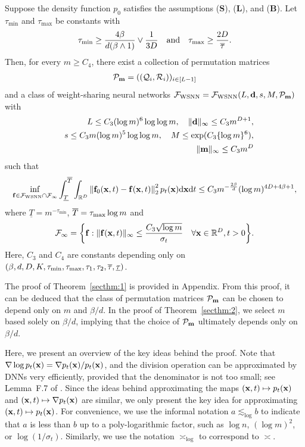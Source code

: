 \documentclass[twoside,11pt]{article}
\def\cF{\mathcal F}
\def\cP{\mathcal P}
\def\cQ{\mathcal Q}
\def\cR{\mathcal R}
\newcommand{\bB}{{\bf B}}
\newcommand{\bd}{{\bf d}}
\newcommand{\bff}{{\bf f}}
\newcommand{\bL}{{\bf L}}
\newcommand{\bfm}{{\bf m}}
\newcommand{\bS}{{\bf S}}
\newcommand{\bx}{{\bf x}}
\newcommand{\bbR}{{\mathbb R}}
\newcommand{\bean}{\setlength\arraycolsep{1pt}\begin{eqnarray*}}
\newcommand{\eean}{\end{eqnarray*}}
\def\d{{\rm d}}
\begin{document}
\begin{theorem}
\label{secthm:1}
Suppose the density function $p_0$ satisfies the assumptions (\bS), (\bL), and (\bB). Let $\tau_{\min}$ and $\tau_{\max}$ be constants with
\bean
\tau_{\rm min} \geq \frac{4\beta}{d (\beta \wedge 1)} \vee \frac{1}{3D}
\quad \text{and} \quad
\tau_{\rm max} \geq \frac{2D}{\overline \tau}.
\eean
Then, for every $m \geq  C_{4}$, there exist a collection of permutation matrices 
\bean
\cP_{\bfm} = ( ( \cQ_i, \cR_i ) )_{i \in [L-1]}
\eean
and a class of weight-sharing neural networks $\cF_{\rm WSNN} = \cF_{\rm WSNN}(L,\bd,s,M,\cP_{\bfm})$ with
\bean
&& L \leq C_{3} ( \log m )^{6} \log \log m , \quad \| \bd\|_{\infty} \leq C_{3}  m^{D+1},
\\
&& s \leq  C_{3}  m (\log m)^{5} \log \log m, \quad M \leq \exp( C_{3}  \{ \log m \}^6 ),
\\
&& \| \bfm \|_{\infty} \leq C_{3} m^{D}
\eean
such that
\bean
 \inf_{\bff \in \cF_{\rm WSNN} \cap \cF_\infty }
 \int_{\underline{T}}^{\overline{T}} \int_{\bbR^{D}} \left\| \bff_0(\bx, t) - \bff(\bx,t) \right\|_2^2 p_t(\bx) \d \bx \d t
 \leq  C_{3}  m^{-\frac{2\beta}{d}} (\log m)^{4D+ 4\beta + 1},
\eean
where $\underline{T} = m^{-\tau_{\min}}$, $\overline{T} = \tau_{\rm max} \log m$ and
\bean
 \cF_\infty = \bigg\{ \bff: \| \bff(\bx,t) \|_{\infty} \leq \frac{C_{3} \sqrt{\log m}}{\sigma_t} \quad \forall \bx \in \bbR^{D}, t > 0 \bigg\}.
\eean
Here, $C_3$ and $C_{4}$ are constants depending only on $(\beta, d, D, K, \tau_{\rm min}, \tau_{\rm max}, \tau_{1}, \tau_{2}, \overline{\tau}, \underline{\tau})$.
\end{theorem}

The proof of Theorem~\ref{secthm:1} is provided in Appendix.
From this proof, it can be deduced that the class of permutation matrices $\cP_{\bfm}$ can be chosen to depend only on $m$ and $\beta/d$. In the proof of Theorem~\ref{secthm:2}, we select $m$ based solely on $\beta/d$, implying that the choice of $\cP_{\bfm}$ ultimately depends only on $\beta/d$.


Here, we present an overview of the key ideas behind the proof. Note that $\nabla \log p_{t}(\bx) = \nabla p_{t}(\bx) / p_{t}(\bx)$, and the division operation can be approximated by DNNs very efficiently, provided that the denominator is not too small;
see Lemma~F.7 of \citet{oko2023diffusion}. Since the ideas behind approximating the maps $(\bx,t) \mapsto p_t(\bx)$ and $(\bx, t) \mapsto \nabla p_t(\bx)$ are similar, we only present the key idea for approximating $(\bx, t) \mapsto p_t(\bx)$. For convenience, we use the informal notation $a \lesssim_{\log} b$ to indicate that $a$ is less than $b$ up to a poly-logarithmic factor, such as $\log n$, $(\log m)^2$, or $\log ( 1 / \sigma_t )$. Similarly, we use the notation $\asymp_{\log}$ to correspond to $\asymp$.
\end{document}
